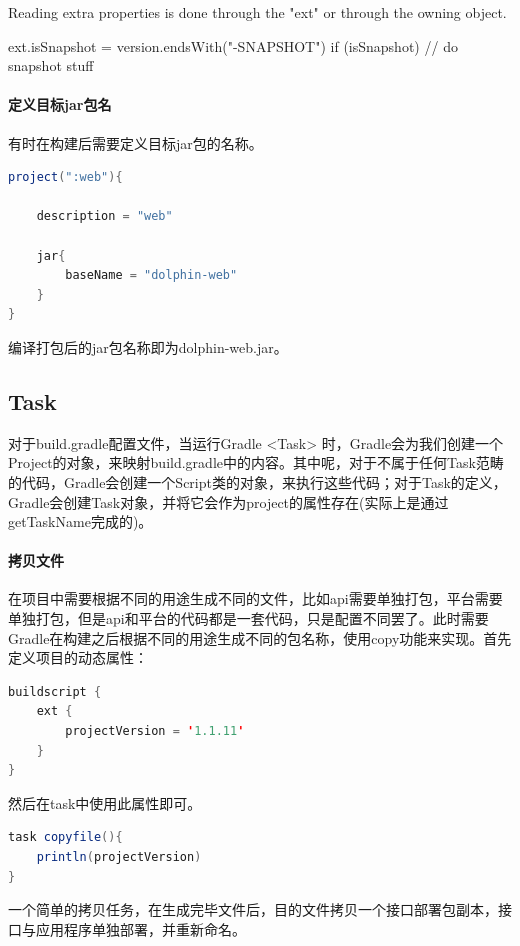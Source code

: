 \documentclass[letter]{book}
\begin{document}
Reading extra properties is done through the "ext" or through the owning object.


ext.isSnapshot = version.endsWith("-SNAPSHOT")
if (isSnapshot) {
	// do snapshot stuff
}

\paragraph{定义目标jar包名}

有时在构建后需要定义目标jar包的名称。

\begin{lstlisting}[language=Java]
project(":web"){

	description = "web"
	
	jar{
		baseName = "dolphin-web"
	}
}
\end{lstlisting}

编译打包后的jar包名称即为dolphin-web.jar。

\subsection{Task}

对于build.gradle配置文件，当运行Gradle <Task> 时，Gradle会为我们创建一个Project的对象，来映射build.gradle中的内容。其中呢，对于不属于任何Task范畴的代码，Gradle会创建一个Script类的对象，来执行这些代码；对于Task的定义，Gradle会创建Task对象，并将它会作为project的属性存在(实际上是通过getTaskName完成的)。


\paragraph{拷贝文件}

在项目中需要根据不同的用途生成不同的文件，比如api需要单独打包，平台需要单独打包，但是api和平台的代码都是一套代码，只是配置不同罢了。此时需要Gradle在构建之后根据不同的用途生成不同的包名称，使用copy功能来实现。首先定义项目的动态属性：

\begin{lstlisting}[language=Java]
buildscript {
	ext {
		projectVersion = '1.1.11'
	}
}
\end{lstlisting}

然后在task中使用此属性即可。

\begin{lstlisting}[language=Java]
task copyfile(){
	println(projectVersion)
}
\end{lstlisting}

一个简单的拷贝任务，在生成完毕文件后，目的文件拷贝一个接口部署包副本，接口与应用程序单独部署，并重新命名。
\end{document}
